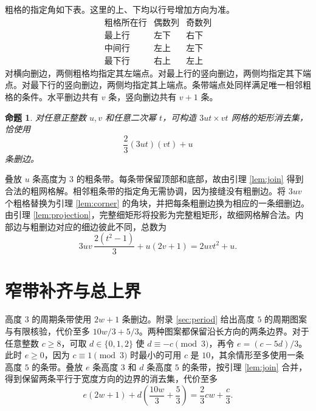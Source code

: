 \documentclass[UTF8,11pt,a4paper,fontset=none]{ctexart}
\makeatletter
\theoremstyle{plain}
\newtheorem{proposition}[theorem]{命题}
\theoremstyle{definition}
\renewcommand{\proofname}{证明}
\renewenvironment{proof}[1][\proofname]{\par
  \pushQED{\qed}%
  \normalfont
  \topsep6\p@\@plus6\p@\relax
  \trivlist
  \item[\hskip\labelsep
        \bfseries#1\@addpunct{.}]%
  \ignorespaces
}{%
  \popQED\endtrivlist\@endpefalse
}
\makeatother
\begin{document}
粗格的指定角如下表。这里的上、下均以行号增加方向为准。
\[
\begin{array}{c|cc}
  \text{粗格所在行} & \text{偶数列} & \text{奇数列}\\ \hline
  \text{最上行} & \text{左下} & \text{右下}\\
  \text{中间行} & \text{左上} & \text{左下}\\
  \text{最下行} & \text{右上} & \text{左上}
\end{array}
\]
对横向删边，两侧粗格均指定其左端点。对最上行的竖向删边，两侧均指定其下端点。对最下行的竖向删边，两侧均指定其上端点。条带端点处同样满足唯一相邻粗格的条件。水平删边共有 \(v\) 条，竖向删边共有 \(v+1\) 条。

\begin{proposition}\label{prop:core}
对任意正整数 \(u,v\) 和任意二次幂 \(t\)，可构造 \(3ut\times vt\) 网格的矩形消去集，恰使用
\[
  \frac23(3ut)(vt)+u
\]
条删边。
\end{proposition}

\begin{proof}
叠放 \(u\) 条高度为 \(3\) 的粗条带。每条带保留顶部和底部，故由引理 \ref{lem:join} 得到合法的粗网格解。相邻粗条带的指定角无需协调，因为接缝没有粗删边。将 \(3uv\) 个粗格替换为引理 \ref{lem:corner} 的角块，并把每条粗删边换为相应的一条细删边。由引理 \ref{lem:projection}，完整细矩形将投影为完整粗矩形，故细网格解合法。内部边与粗删边对应的细边彼此不同，总数为
\[
  3uv\,\frac{2(t^2-1)}3+u(2v+1)=2uvt^2+u.
\]
\end{proof}

\section{窄带补齐与总上界}

高度 \(3\) 的周期条带使用 \(2w+1\) 条删边。附录 \ref{sec:period} 给出高度 \(5\) 的周期图案与有限核验，代价至多 \(10w/3+5/3\)。两种图案都保留沿长方向的两条边界。对于任意整数 \(c\ge8\)，可取 \(d\in\{0,1,2\}\) 使 \(d\equiv -c\pmod3\)，再令 \(e=(c-5d)/3\)。此时 \(e\ge0\)，因为 \(c\equiv1\pmod3\) 时最小的可用 \(c\) 是 \(10\)，其余情形至多使用一条高度 \(5\) 的条带。叠放 \(e\) 条高度 \(3\) 和 \(d\) 条高度 \(5\) 的条带，按引理 \ref{lem:join} 合并，得到保留两条平行于宽度方向的边界的消去集，代价至多
\begin{equation}\label{eq:fringe}
  e(2w+1)+d\left(\frac{10w}3+\frac53\right)
  =\frac23cw+\frac c3.
\end{equation}
\end{document}
